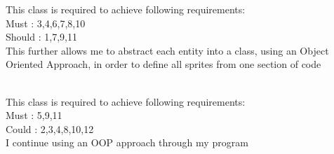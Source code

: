 \documentclass[12pt]{article}
\begin{document}
\newpage
This class is required to achieve following requirements:\\
Must : 3,4,6,7,8,10\\
Should : 1,7,9,11\\
This further allows me to abstract each entity into a class, using an Object Oriented Approach, in order to define all sprites from one section of code\\
\begin{table}[H]
    \centering
\end{table}
\\
This class is required to achieve following requirements:\\
Must : 5,9,11\\
Could : 2,3,4,8,10,12\\
I continue using an OOP approach through my program
\begin{table}[H]
    \centering
\end{table}
\end{document}
